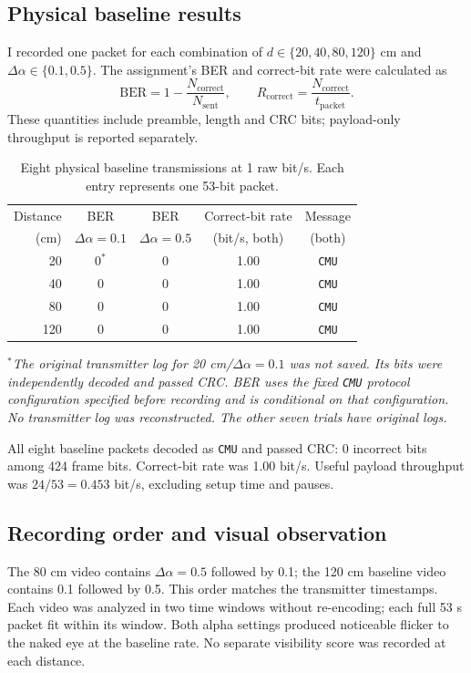 \documentclass[10pt,a4paper,twoside]{article}
\begin{document}
\subsection{Physical baseline results}
I recorded one packet for each combination of $d\in\{20,40,80,120\}$ cm and $\Delta\alpha\in\{0.1,0.5\}$. The assignment's BER and correct-bit rate were calculated as
\[
\mathrm{BER}=1-\frac{N_{\mathrm{correct}}}{N_{\mathrm{sent}}},
\qquad R_{\mathrm{correct}}=\frac{N_{\mathrm{correct}}}{t_{\mathrm{packet}}}.
\]
These quantities include preamble, length and CRC bits; payload-only throughput is reported separately.
\begin{table}[H]
\centering
\begin{tabular}{rcccc}
\hline
Distance & BER & BER & Correct-bit rate & Message \\
(cm) & $\Delta\alpha=0.1$ & $\Delta\alpha=0.5$ & (bit/s, both) & (both) \\
\hline
20 & $0^{*}$ & 0 & 1.00 & \texttt{CMU} \\
40 & 0 & 0 & 1.00 & \texttt{CMU} \\
80 & 0 & 0 & 1.00 & \texttt{CMU} \\
120 & 0 & 0 & 1.00 & \texttt{CMU} \\
\hline
\end{tabular}
\caption{Eight physical baseline transmissions at 1 raw bit/s. Each entry represents one 53-bit packet.}
\label{tab:communication}
\end{table}
\noindent\textit{$^{*}$The original transmitter log for 20 cm/$\Delta\alpha=0.1$ was not saved. Its bits were independently decoded and passed CRC. BER uses the fixed \texttt{CMU} protocol configuration specified before recording and is conditional on that configuration. No transmitter log was reconstructed. The other seven trials have original logs.}

All eight baseline packets decoded as \texttt{CMU} and passed CRC: 0 incorrect bits among 424 frame bits. Correct-bit rate was 1.00 bit/s. Useful payload throughput was $24/53=0.453$ bit/s, excluding setup time and pauses.
\subsection{Recording order and visual observation}
The 80 cm video contains $\Delta\alpha=0.5$ followed by 0.1; the 120 cm baseline video contains 0.1 followed by 0.5. This order matches the transmitter timestamps. Each video was analyzed in two time windows without re-encoding; each full 53 s packet fit within its window. Both alpha settings produced noticeable flicker to the naked eye at the baseline rate. No separate visibility score was recorded at each distance.
\end{document}
